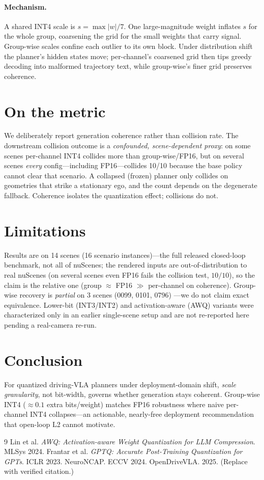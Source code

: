 \documentclass[conference]{IEEEtran}
\begin{document}
\paragraph{Mechanism.} A shared INT4 scale is $s=\max|w|/7$. One large-magnitude weight inflates
$s$ for the whole group, coarsening the grid for the small weights that carry signal. Group-wise
scales confine each outlier to its own block. Under distribution shift the planner's hidden states
move; per-channel's coarsened grid then tips greedy decoding into malformed trajectory text, while
group-wise's finer grid preserves coherence.

\section{On the metric}
We deliberately report generation coherence rather than collision rate. The downstream collision
outcome is a \emph{confounded, scene-dependent proxy}: on some scenes per-channel INT4 collides more
than group-wise/FP16, but on several scenes \emph{every} config---including FP16---collides 10/10
because the base policy cannot clear that scenario. A collapsed (frozen) planner only collides on
geometries that strike a stationary ego, and the count depends on the degenerate fallback. Coherence
isolates the quantization effect; collisions do not.

\section{Limitations}
Results are on 14 scenes (16 scenario instances)---the full released closed-loop benchmark, not all
of nuScenes; the rendered inputs are out-of-distribution to real nuScenes (on several scenes even FP16
fails the collision test, $10/10$), so the claim is the relative one (group $\approx$ FP16
$\gg$ per-channel on coherence). Group-wise recovery is \emph{partial} on 3 scenes (0099, 0101, 0796)
---we do not claim exact equivalence. Lower-bit (INT3/INT2) and activation-aware
(AWQ) variants were characterized only in an earlier single-scene setup and are not re-reported here
pending a real-camera re-run.

\section{Conclusion}
For quantized driving-VLA planners under deployment-domain shift, \emph{scale granularity}, not
bit-width, governs whether generation stays coherent. Group-wise INT4 ($\approx 0.1$ extra
bits/weight) matches FP16 robustness where naive per-channel INT4 collapses---an actionable,
nearly-free deployment recommendation that open-loop L2 cannot motivate.

\begin{thebibliography}{9}
 Lin et al. \emph{AWQ: Activation-aware Weight Quantization for LLM Compression}. MLSys 2024.
 Frantar et al. \emph{GPTQ: Accurate Post-Training Quantization for GPTs}. ICLR 2023.
 NeuroNCAP. ECCV 2024.
 OpenDriveVLA. 2025. (Replace with verified citation.)
\end{thebibliography}
\end{document}
